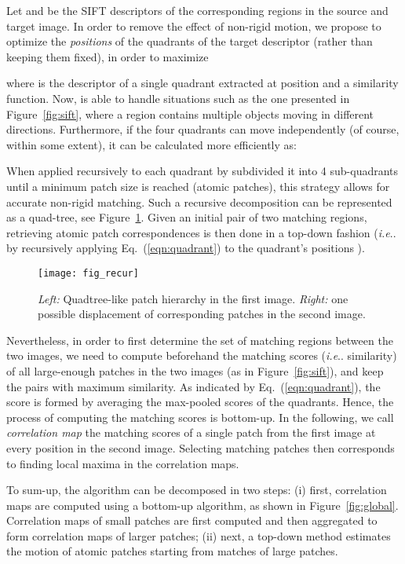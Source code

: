 \documentclass[twocolumn,natbib]{svjour3}
\makeatletter
\DeclareRobustCommand\onedot{\futurelet\@let@token\@onedot}
\def\@onedot{\ifx\@let@token.\else.\null\fi\xspace}
\def\ie{\emph{i.e}\onedot} \def\Ie{\emph{I.e}\onedot}
\def\eq{Eq.~}
\newcommand{\refp}[1]{(\ref{#1})}
\makeatother
\begin{document}
Let  and  be the SIFT descriptors of the corresponding regions in the source and target image.
In order to remove the effect of non-rigid motion,
we propose to optimize the \emph{positions}  of the  quadrants of the target descriptor  
(rather than keeping them fixed), in order to maximize 

where  is the descriptor of a single quadrant
extracted at position  and  a similarity function. 
Now,  is able to handle situations such as the one presented in Figure~\ref{fig:sift},
where a region contains multiple objects moving in different directions.
Furthermore, if the four quadrants can move independently (of course, within some extent), 
it can be calculated more efficiently as:

When applied recursively to each quadrant by subdivided it into 4
sub-quadrants until a minimum patch size is reached (atomic patches),
this strategy allows for accurate non-rigid matching. 
Such a recursive decomposition can be represented as a quad-tree, see Figure~\ref{fig:recur}. 
Given an initial pair of two matching regions, retrieving atomic patch correspondences is then done in a top-down fashion (\ie by recursively applying \eq\refp{eqn:quadrant} to the quadrant's positions ).

\begin{figure}
  \centering
  \texttt{[image: fig\_recur]}
  \caption{\textit{Left:} Quadtree-like patch hierarchy in the first image.
    \textit{Right:} one possible displacement of corresponding patches in the second image.}
  \label{fig:recur}
\end{figure}


Nevertheless, in order to first determine the set of matching regions
between the two images, we need to compute beforehand the matching
scores (\ie similarity) of all large-enough patches in the two images
(as in Figure~\ref{fig:sift}), and keep the pairs with maximum
similarity. As indicated by \eq\refp{eqn:quadrant}, the score is
formed by averaging the max-pooled scores of the quadrants.
Hence, the process of computing the matching scores is bottom-up. In
the following, we call \emph{correlation map} the matching scores of a
single patch from the first image at every position in the second
image. Selecting matching patches then corresponds to finding local maxima
in the correlation maps. 

To sum-up, the algorithm can be decomposed in two steps:
(i) first, correlation maps are computed using a bottom-up algorithm,
as shown in Figure~\ref{fig:global}. 
Correlation maps of small patches are first computed and then aggregated to form correlation maps of larger patches;
(ii) next, a top-down method estimates the motion of atomic patches starting from matches of large patches.
\end{document}
